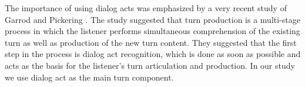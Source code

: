 The importance of using dialog acts was emphasized by a very recent study of Garrod and Pickering \cite{garrod2015use}. The study suggested that turn production is a multi-stage process in which the listener performs simultaneous comprehension of the existing turn as well as production of the new turn content. They suggested that the first step in the process is dialog act recognition, which is done as soon as possible and acts as the basis for the listener's turn articulation and production. In our study we use dialog act as the main turn component.

